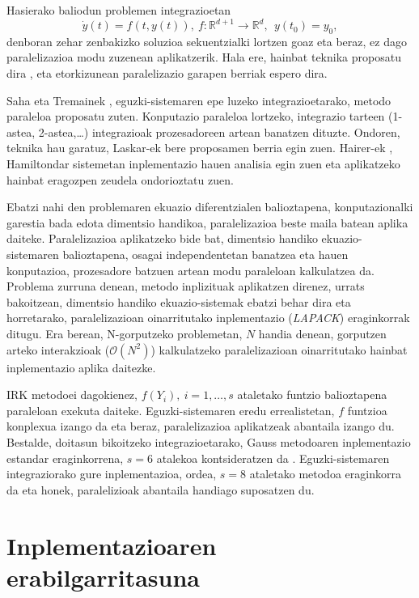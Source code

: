 Hasierako baliodun problemen integrazioetan
\begin{equation}
 \label{eq:eztivp}
\dot{y}(t)=f(t,y(t)), \ f: \mathbb{R}^{d+1} \longrightarrow \mathbb{R}^d, \ \ y(t_0)=y_0,
\end{equation} 
 denboran zehar zenbakizko soluzioa sekuentzialki lortzen goaz eta beraz, ez dago  paralelizazioa modu zuzenean aplikatzerik. Hala ere, hainbat teknika proposatu dira \cite{Burrage1993}, eta etorkizunean paralelizazio garapen berriak espero dira.   

Saha eta Tremainek \cite{Saha1996}, eguzki-sistemaren epe luzeko integrazioetarako, metodo paraleloa proposatu zuten. Konputazio paraleloa lortzeko, integrazio tarteen (1-astea, 2-astea,\dots) integrazioak prozesadoreen artean banatzen dituzte. Ondoren, teknika hau garatuz, Laskar-ek \cite{Jimenez-Perez2011} bere proposamen berria egin zuen. Hairer-ek \cite{Gander2014}, Hamiltondar sistemetan inplementazio hauen  analisia egin zuen eta aplikatzeko hainbat eragozpen zeudela ondorioztatu zuen.

Ebatzi nahi den problemaren ekuazio diferentzialen balioztapena, konputazionalki garestia bada edota dimentsio handikoa, paralelizazioa beste maila batean aplika daiteke. Paralelizazioa aplikatzeko bide bat, dimentsio handiko ekuazio-sistemaren balioztapena, osagai independentetan banatzea eta hauen konputazioa, prozesadore batzuen artean modu paraleloan kalkulatzea da. Problema zurruna denean, metodo inplizituak aplikatzen direnez, urrats bakoitzean, dimentsio handiko ekuazio-sistemak ebatzi behar dira eta horretarako, paralelizazioan oinarritutako inplementazio (\emph{LAPACK}) eraginkorrak ditugu. Era berean, N-gorputzeko problemetan, $N$ handia denean, gorputzen arteko interakzioak ($\mathcal{O}(N^2)$) kalkulatzeko         
paralelizazioan oinarritutako hainbat inplementazio \cite{Barnes1986,Carrier1988,Driscoll2013} aplika daitezke. 

IRK metodoei dagokienez, $f(Y_i), \ i=1,\dots,s$ ataletako funtzio balioztapena paraleloan exekuta daiteke. Eguzki-sistemaren eredu errealistetan, $f$ funtzioa konplexua izango da eta beraz, paralelizazioa aplikatzeak abantaila izango du. Bestalde, doitasun bikoitzeko integrazioetarako, Gauss metodoaren inplementazio estandar eraginkorrena, $s=6$ atalekoa kontsideratzen da \cite{Hairer2006}. Eguzki-sistemaren integraziorako gure inplementazioa, ordea, $s=8$ ataletako metodoa eraginkorra da eta honek, paralelizioak abantaila handiago suposatzen du.    


\section{Inplementazioaren erabilgarritasuna}


